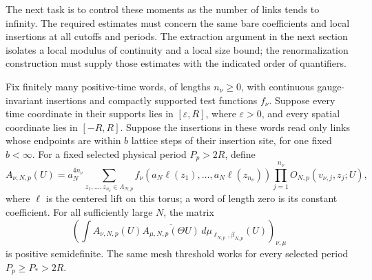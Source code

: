 The next task is to control these moments as the number of links tends to
infinity. The required estimates must concern the same bare coefficients and
local insertions at all cutoffs and periods. The extraction argument in the
next section isolates a local modulus of continuity and a local size bound;
the renormalization construction must supply those estimates with the indicated
order of quantifiers.

\begin{corollary}
\label{cor:ex-lattice-smeared-reflection}
Fix finitely many positive-time words, of lengths $n_\nu\ge0$, with
continuous gauge-invariant insertions and compactly supported test
functions $f_\nu$. Suppose every time coordinate in their supports lies
in $[\varepsilon,R]$, where $\varepsilon>0$, and every spatial
coordinate lies in $[-R,R]$. Suppose the insertions in these words read
only links whose endpoints are within $b$ lattice steps of their insertion
site, for one fixed $b<\infty$. For a fixed selected physical period
$P_p>2R$, define
\[
 A_{\nu,N,p}(U)=a_N^{4n_\nu}
  \sum_{z_1,\ldots,z_{n_\nu}\in\Lambda_{N,p}}
  f_\nu(a_N\ell(z_1),\ldots,a_N\ell(z_{n_\nu}))
  \prod_{j=1}^{n_\nu}O_{N,p}(v_{\nu,j},z_j;U),
\]
where $\ell$ is the centered lift on this torus; a word of length zero
is its constant coefficient. For all sufficiently large $N$, the matrix
\[
 \left(\int A_{\nu,N,p}(U)
       \overline{A_{\mu,N,p}(\Theta U)}\,d\mu_{\ell_{N,p},\beta_{N,p}}(U)
       \right)_{\nu,\mu}
\]
is positive semidefinite. The same mesh threshold works for every selected
period $P_p\ge P_*>2R$.
\end{corollary}

